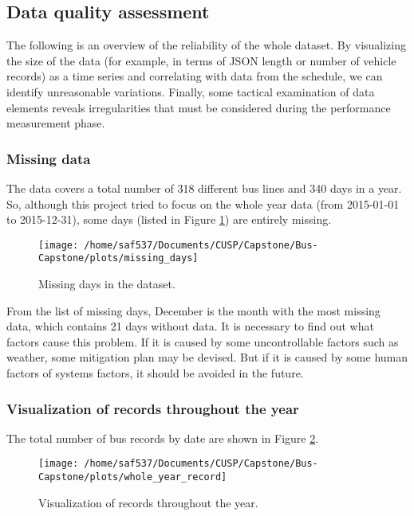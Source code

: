 \documentclass[12pt]{report}
\begin{document}
\subsection{Data quality assessment}


The following is an overview of the reliability of the whole dataset. By visualizing the size of the data (for example, in terms of JSON length or number of vehicle records) as a time series and correlating with data from the schedule, we can identify unreasonable variations.  Finally, some tactical examination of data elements reveals irregularities that must be considered during the performance measurement phase.

\subsubsection*{Missing data}

The data covers a total number of 318 different bus lines and 340 days in a year. So, although this project tried to focus on the whole year data (from 2015-01-01 to 2015-12-31), some days (listed in Figure \ref{m_days}) are entirely missing.
  
  \begin{figure}[!ht]
  \caption{Missing days in the dataset.}
  \label{m_days}
  \centering
    \texttt{[image: /home/saf537/Documents/CUSP/Capstone/Bus-Capstone/plots/missing\_days]}
\end{figure}

From the list of missing days, December is the month with the most missing data, which contains 21 days without data. It is necessary to find out what factors cause this problem. If it is caused by some uncontrollable factors such as weather, some mitigation plan may be devised. But if it is caused by some human factors of systems factors, it should be avoided in the future.
      
\subsubsection*{Visualization of records throughout the year}
      
The total number of bus records by date are shown in Figure \ref{m_alldays}.



\begin{figure}[!ht]
  \caption{Visualization of records throughout the year.}
  \label{m_alldays}
  \centering
    \texttt{[image: /home/saf537/Documents/CUSP/Capstone/Bus-Capstone/plots/whole\_year\_record]}
\end{figure}
\end{document}
